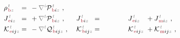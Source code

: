 \begin{subequations}
\begin{align}
	&{\rho}^{\;\!\mathcolor{gray}{t}}_{\;\!\textcolor{Maroon}{\text{b}} \mathcolor{gray}{z}} \hspace{-1em}&&=\hspace{0.2em} &&\hspace{-0.7em}- \mathcolor{gray}{\nabla^i} {\mathcal{P}}^{\;\!\mathcolor{gray}{t}}_{\;\!\textcolor{Maroon}{\text{b}} i \mathcolor{gray}{z}}~, &&\hspace{0.3em} \hspace{-1em}&& &&\hspace{-0.7em} \label{eq:pb} \\
	&{J}^{\;\!\mathcolor{gray}{t}}_{\;\!\textcolor{Maroon}{\text{e}} i \mathcolor{gray}{z}} \hspace{-1em}&&=\hspace{0.2em} &&\hspace{-0.7em}+ \mathcolor{gray}{\nabla^t} {\mathcal{P}}^{\;\!\mathcolor{gray}{t}}_{\;\!\textcolor{Maroon}{\text{b}} i \mathcolor{gray}{z}}~, &&\hspace{0.3em} {J}^{\;\!\mathcolor{gray}{t}}_{\;\!\textcolor{Maroon}{\text{b}} i \mathcolor{gray}{z}} \hspace{-1em}&&=\hspace{0.2em} ~ \hphantom{-\frac{1}{2!} \epsilon^{\hphantom{ij}k}_{i\mathcolor{gray}{j}}} {J}^{\;\!\mathcolor{gray}{t}}_{\;\!\textcolor{Maroon}{\text{e}} i \mathcolor{gray}{z}} &&\hspace{-0.7em}+ {J}^{\;\!\mathcolor{gray}{t}}_{\;\!\textcolor{Maroon}{\text{m}} i \mathcolor{gray}{z}}~, \label{eq:Je-Jb} \\
	&{\mathcal{K}}^{\;\!\mathcolor{gray}{t}}_{\;\!\textcolor{Maroon}{\text{e}} ij \mathcolor{gray}{z}} \hspace{-1em}&&=\hspace{0.2em} &&\hspace{-0.7em}- \mathcolor{gray}{\nabla^t} {\mathcal{Q}}^{\;\!\mathcolor{gray}{t}}_{\;\!\textcolor{Maroon}{\text{b}} ij \mathcolor{gray}{z}}~, &&\hspace{0.3em} {\mathcal{K}}^{\;\!\mathcolor{gray}{t}}_{\;\!\textcolor{Maroon}{\text{b}} ij \mathcolor{gray}{z}} \hspace{-1em}&&=\hspace{0.2em} ~ \hphantom{-\frac{1}{2!} \epsilon^{\hphantom{ij}k}_{i\mathcolor{gray}{j}}} {\mathcal{K}}^{\;\!\mathcolor{gray}{t}}_{\;\!\textcolor{Maroon}{\text{e}} ij \mathcolor{gray}{z}} &&\hspace{-0.7em}+ {\mathcal{K}}^{\;\!\mathcolor{gray}{t}}_{\;\!\textcolor{Maroon}{\text{m}} ij \mathcolor{gray}{z}}~, \label{eq:Ke-Kb} \\

\end{align}
\end{subequations}
